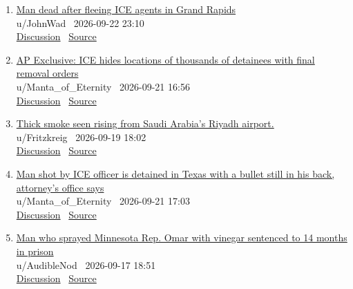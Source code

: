 \documentclass[11pt,a4paper]{article}
\begin{document}
\begin{enumerate}
  \item \href{https://www.reddit.com/r/news/comments/1wnp2yz/man_dead_after_fleeing_ice_agents_in_grand_rapids/}{Man dead after fleeing ICE agents in Grand Rapids}\\ {\small u/JohnWad \textbullet\ 2026-09-22 23:10}\\ {\small \href{https://www.reddit.com/r/news/comments/1wnp2yz/man_dead_after_fleeing_ice_agents_in_grand_rapids/}{Discussion} \textbullet\ \href{https://www.freep.com/story/news/local/michigan/2026/09/22/man-dead-fleeing-ice-agents-grand-rapids/91894736007/}{Source}}
  \item \href{https://www.reddit.com/r/news/comments/1wmih0e/ap_exclusive_ice_hides_locations_of_thousands_of/}{AP Exclusive: ICE hides locations of thousands of detainees with final removal orders}\\ {\small u/Manta\_of\_Eternity \textbullet\ 2026-09-21 16:56}\\ {\small \href{https://www.reddit.com/r/news/comments/1wmih0e/ap_exclusive_ice_hides_locations_of_thousands_of/}{Discussion} \textbullet\ \href{https://apnews.com/article/ice-detainee-locator-disappear-removal-orders-c3329a70bce424879bc5880b286c019c}{Source}}
  \item \href{https://www.reddit.com/r/news/comments/1wkszxt/thick_smoke_seen_rising_from_saudi_arabias_riyadh/}{Thick smoke seen rising from Saudi Arabia's Riyadh airport.}\\ {\small u/Fritzkreig \textbullet\ 2026-09-19 18:02}\\ {\small \href{https://www.reddit.com/r/news/comments/1wkszxt/thick_smoke_seen_rising_from_saudi_arabias_riyadh/}{Discussion} \textbullet\ \href{https://www.bbc.com/news/articles/cwly5d9v7r43o}{Source}}
  \item \href{https://www.reddit.com/r/news/comments/1wminye/man_shot_by_ice_officer_is_detained_in_texas_with/}{Man shot by ICE officer is detained in Texas with a bullet still in his back, attorney's office says}\\ {\small u/Manta\_of\_Eternity \textbullet\ 2026-09-21 17:03}\\ {\small \href{https://www.reddit.com/r/news/comments/1wminye/man_shot_by_ice_officer_is_detained_in_texas_with/}{Discussion} \textbullet\ \href{https://apnews.com/article/austin-texas-ice-shooting-driver-wilber-perez-ebdb9d481d28e322f62c15f1076f3c18}{Source}}
  \item \href{https://www.reddit.com/r/news/comments/1wj2poh/man_who_sprayed_minnesota_rep_omar_with_vinegar/}{Man who sprayed Minnesota Rep. Omar with vinegar sentenced to 14 months in prison}\\ {\small u/AudibleNod \textbullet\ 2026-09-17 18:51}\\ {\small \href{https://www.reddit.com/r/news/comments/1wj2poh/man_who_sprayed_minnesota_rep_omar_with_vinegar/}{Discussion} \textbullet\ \href{https://www.ctvnews.ca/world/article/man-who-sprayed-minnesota-rep-omar-with-vinegar-sentenced-to-14-months-in-prison/}{Source}}

\end{enumerate}
\end{document}
